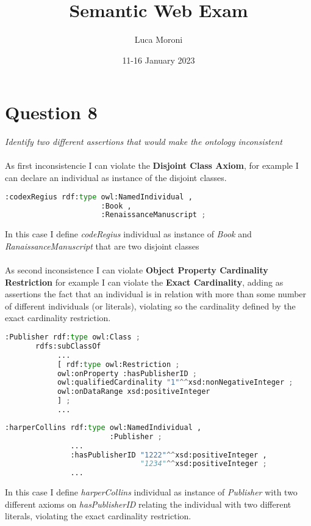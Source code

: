 \documentclass[12pt]{report}
\title{Semantic Web Exam}
\author{Luca Moroni}
\date{11-16 January 2023}
\begin{document}
\maketitle

\section*{Question 8}
\textit{Identify two different assertions that would make the ontology inconsistent}
\\~\\
As first inconsistencie I can violate the \textbf{Disjoint Class Axiom}, for example I can declare an individual as instance of the disjoint classes.\\
\begin{lstlisting}[language=Python]
:codexRegius rdf:type owl:NamedIndividual ,
                      :Book ,
                      :RenaissanceManuscript ;
\end{lstlisting}
In this case I define \textit{codeRegius} individual as instance of \textit{Book} and \textit{RanaissanceManuscript} that are two disjoint classes\\~\\
As second inconsistence I can violate \textbf{Object Property Cardinality Restriction} for example I can violate the \textbf{Exact Cardinality}, adding as assertions the fact that an individual is in relation with more than some number of different individuals (or literals), violating so the cardinality defined by the exact cardinality restriction.\\
\begin{lstlisting}[language=Python, caption=Publisher class definition with exactly cardinality of 1 constraint on hasPublisherID]
:Publisher rdf:type owl:Class ;
       rdfs:subClassOf
            ...
            [ rdf:type owl:Restriction ;
            owl:onProperty :hasPublisherID ;
            owl:qualifiedCardinality "1"^^xsd:nonNegativeInteger ;
            owl:onDataRange xsd:positiveInteger
            ] ;
            ...
\end{lstlisting}
\begin{lstlisting}[language=Python, caption=Publisher individual with two publisherID]
:harperCollins rdf:type owl:NamedIndividual ,
                        :Publisher ;
               ...
               :hasPublisherID "1222"^^xsd:positiveInteger ,
                               "1234"^^xsd:positiveInteger ;
               ...
\end{lstlisting}
In this case I define \textit{harperCollins} individual as instance of \textit{Publisher} with two different axioms on \textit{hasPublisherID} relating the individual with two different literals, violating the exact cardinality restriction.
\newpage
\end{document}
